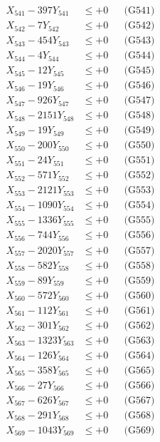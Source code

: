 \documentclass[a4paper,10pt]{article}
\begin{document}
{\begin{align}
\allowbreak
X_{541} - 397Y_{541} &\leq +0 && \text{(G541)} \\
X_{542} - 7Y_{542} &\leq +0 && \text{(G542)} \\
X_{543} - 454Y_{543} &\leq +0 && \text{(G543)} \\
X_{544} - 4Y_{544} &\leq +0 && \text{(G544)} \\
X_{545} - 12Y_{545} &\leq +0 && \text{(G545)} \\
X_{546} - 19Y_{546} &\leq +0 && \text{(G546)} \\
X_{547} - 926Y_{547} &\leq +0 && \text{(G547)} \\
X_{548} - 2151Y_{548} &\leq +0 && \text{(G548)} \\
X_{549} - 19Y_{549} &\leq +0 && \text{(G549)} \\
X_{550} - 200Y_{550} &\leq +0 && \text{(G550)} \\
\allowbreak
X_{551} - 24Y_{551} &\leq +0 && \text{(G551)} \\
X_{552} - 571Y_{552} &\leq +0 && \text{(G552)} \\
X_{553} - 2121Y_{553} &\leq +0 && \text{(G553)} \\
X_{554} - 1090Y_{554} &\leq +0 && \text{(G554)} \\
X_{555} - 1336Y_{555} &\leq +0 && \text{(G555)} \\
X_{556} - 744Y_{556} &\leq +0 && \text{(G556)} \\
X_{557} - 2020Y_{557} &\leq +0 && \text{(G557)} \\
X_{558} - 582Y_{558} &\leq +0 && \text{(G558)} \\
X_{559} - 89Y_{559} &\leq +0 && \text{(G559)} \\
X_{560} - 572Y_{560} &\leq +0 && \text{(G560)} \\
\allowbreak
X_{561} - 112Y_{561} &\leq +0 && \text{(G561)} \\
X_{562} - 301Y_{562} &\leq +0 && \text{(G562)} \\
X_{563} - 1323Y_{563} &\leq +0 && \text{(G563)} \\
X_{564} - 126Y_{564} &\leq +0 && \text{(G564)} \\
X_{565} - 358Y_{565} &\leq +0 && \text{(G565)} \\
X_{566} - 27Y_{566} &\leq +0 && \text{(G566)} \\
X_{567} - 626Y_{567} &\leq +0 && \text{(G567)} \\
X_{568} - 291Y_{568} &\leq +0 && \text{(G568)} \\
X_{569} - 1043Y_{569} &\leq +0 && \text{(G569)} \\

\end{align}}
\end{document}
